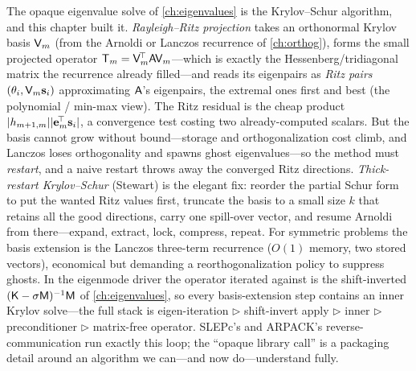 \summarysection
The opaque eigenvalue solve of \cref{ch:eigenvalues} is the Krylov--Schur algorithm, and this
chapter built it. \emph{Rayleigh--Ritz projection} takes an orthonormal Krylov basis $\mathsf{V}_m$
(from the Arnoldi or Lanczos recurrence of \cref{ch:orthog}), forms the small projected operator
$\mathsf{T}_m = \mathsf{V}_m^{\!\top}\mathsf{A}\mathsf{V}_m$---which is exactly the Hessenberg/tridiagonal matrix
the recurrence already filled---and reads its eigenpairs as \emph{Ritz pairs} $(\theta_i,
\mathsf{V}_m\mathbf{s}_i)$ approximating $\mathsf{A}$'s eigenpairs, the extremal ones first and best (the
polynomial / min-max view). The Ritz residual is the cheap product $\lvert h_{m+1,m}\rvert
\lvert\mathbf{e}_m^{\!\top}\mathbf{s}_i\rvert$, a convergence test costing two already-computed scalars. But the basis
cannot grow without bound---storage and orthogonalization cost climb, and Lanczos loses
orthogonality and spawns ghost eigenvalues---so the method must \emph{restart}, and a naive restart
throws away the converged Ritz directions. \emph{Thick-restart Krylov--Schur} (Stewart) is the
elegant fix: reorder the partial Schur form to put the wanted Ritz values first, truncate the basis
to a small size $k$ that retains all the good directions, carry one spill-over vector, and resume
Arnoldi from there---expand, extract, lock, compress, repeat. For symmetric problems the basis
extension is the Lanczos three-term recurrence ($O(1)$ memory, two stored vectors), economical but
demanding a reorthogonalization policy to suppress ghosts. In the eigenmode driver the operator
iterated against is the shift-inverted $(\mathsf{K} - \sigma\mathsf{M})^{-1}\mathsf{M}$ of
\cref{ch:eigenvalues}, so every basis-extension step contains an inner Krylov solve---the full stack
is eigen-iteration $\triangleright$ shift-invert apply $\triangleright$ inner 
$\triangleright$ preconditioner $\triangleright$ matrix-free operator. SLEPc's 
and ARPACK's reverse-communication  run exactly this loop; the ``opaque library call''
is a packaging detail around an algorithm we can---and now do---understand fully.

